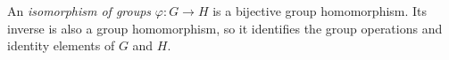 
An \emph{isomorphism of groups} $\varphi:G\to H$ is a bijective group homomorphism. Its inverse is also a group homomorphism, so it identifies the group operations and identity elements of $G$ and $H$.
